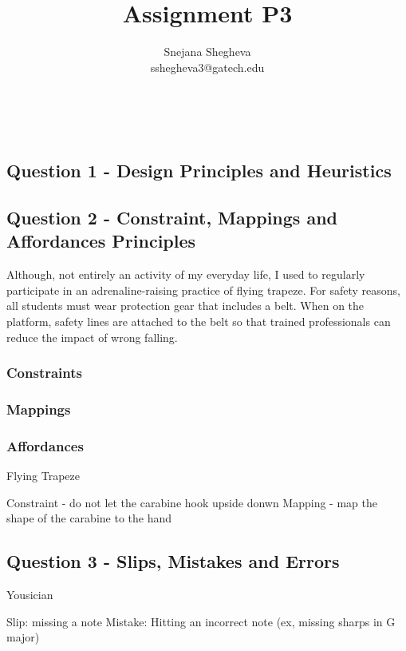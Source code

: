 \documentclass[12pt,letterpaper]{article}
\makeatletter
\renewcommand{\maketitle}{\bgroup
   \begin{center}
   \textbf{{\fontsize{18pt}{20}\selectfont \@title}}\\
   \vspace{10pt}
   {\fontsize{12pt}{0}\selectfont \@author} 
   \end{center}
}
\makeatother
\begin{document}
\title{Assignment P3}
\author{Snejana Shegheva \\ sshegheva3@gatech.edu}

\maketitle
\thispagestyle{fancy}

\subsection*{Question 1 - Design Principles and Heuristics}

\subsection*{Question 2 - Constraint, Mappings and Affordances Principles}

Although, not entirely an activity of my everyday life, I used to regularly participate in an adrenaline-raising practice of flying trapeze. For safety reasons, all students must wear protection gear that includes a belt. When on the platform, safety lines are attached to the belt so that trained professionals can reduce the impact of wrong falling.    

\subsubsection*{Constraints}

\subsubsection*{Mappings}

\subsubsection*{Affordances}
Flying Trapeze

Constraint - do not let the carabine hook upside donwn 
Mapping - map the shape of the carabine to the hand 

\subsection*{Question 3 - Slips, Mistakes and Errors}

Yousician 

Slip: missing a note 
Mistake: Hitting an incorrect note (ex, missing sharps in G major)
\end{document}
